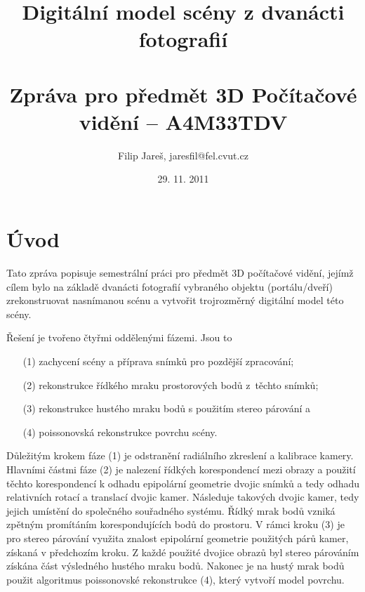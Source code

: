 \documentclass[11pt,oneside,a4paper,pdftex]{article}   %
\title{Digitální model scény z dvanácti fotografií \\ \ \\ \large Zpráva pro předmět 3D Počítačové vidění -- A4M33TDV}
\date{29. 11. 2011}
\author{Filip Jareš, jaresfil@fel.cvut.cz}
\begin{document}
\maketitle

\section*{Úvod}

Tato zpráva popisuje semestrální práci pro předmět 3D počítačové vidění, jejímž cílem bylo na základě
dvanácti fotografií vybraného objektu (portálu/dveří) zrekonstruovat nasnímanou scénu a vytvořit
trojrozměrný digitální model této scény.

Řešení je tvořeno čtyřmi oddělenými fázemi. Jsou to
\begin{enumerate}
	\item[(1)]	zachycení scény a příprava snímků pro pozdější zpracování;
	\item[(2)]	rekonstrukce řídkého mraku prostorových bodů z~těchto snímků;
	\item[(3)]	rekonstrukce hustého mraku bodů s použitím stereo párování a
	\item[(4)]	poissonovská rekonstrukce povrchu scény.
\end{enumerate}



Důležitým krokem fáze (1) je odstranění radiálního zkreslení a kalibrace kamery. Hlavními částmi fáze
(2) je nalezení řídkých korespondencí mezi obrazy a použití těchto korespondencí k odhadu epipolární
geometrie dvojic snímků a tedy odhadu relativních rotací a translací dvojic kamer.  Následuje
 takových dvojic kamer, tedy jejich umístění do společného souřadného systému. Řídký mrak
bodů vzniká zpětným promítáním korespondujících bodů do prostoru. V rámci kroku (3) je pro
stereo párování využita znalost epipolární geometrie použitých párů kamer, získaná v předchozím kroku.
Z každé použité dvojice obrazů byl stereo párováním získána část výsledného hustého mraku bodů.
Nakonec je na hustý mrak bodů použit algoritmus poissonovské rekonstrukce (4), který vytvoří model
povrchu.
\end{document}
